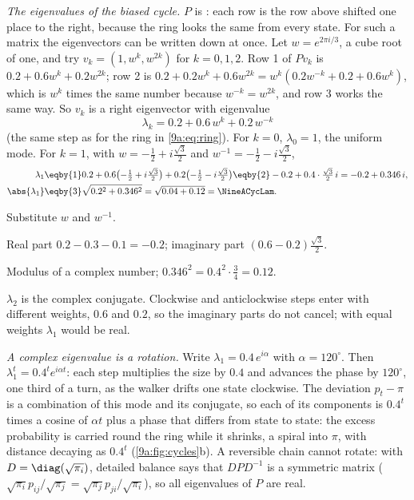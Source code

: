 \emph{The eigenvalues of the biased cycle.} $P$ is : each row is the row
above shifted one place to the right, because the ring looks the same from every state. For such
a matrix the eigenvectors can be written down at once. Let $w=e^{2\pi i/3}$, a cube root of
one, and try $v_k=(1,w^k,w^{2k})$ for $k=0,1,2$. Row 1 of $Pv_k$ is
$0.2+0.6w^k+0.2w^{2k}$; row 2 is $0.2+0.2w^k+0.6w^{2k}=w^k(0.2w^{-k}+0.2+0.6w^k)$, which is
$w^k$ times the same number because $w^{-k}=w^{2k}$, and row 3 works the same way. So $v_k$ is
a right eigenvector with eigenvalue
\begin{equation*}
  \lambda_k=0.2+0.6\,w^k+0.2\,w^{-k}
\end{equation*}
(the same step as for the ring in \eqref{9a:eq:ring}). For $k=0$, $\lambda_0=1$, the uniform
mode. For $k=1$, with $w=-\tfrac12+i\tfrac{\sqrt3}2$ and $w^{-1}=-\tfrac12-i\tfrac{\sqrt3}2$,
\begin{align*}
  \lambda_1&\eqby{1}0.2+0.6\bigl(-\tfrac12+i\tfrac{\sqrt3}2\bigr)+0.2\bigl(-\tfrac12-i\tfrac{\sqrt3}2\bigr)
   \eqby{2}-0.2+0.4\cdot\tfrac{\sqrt3}2\,i=-0.2+0.346\,i,\\
  \abs{\lambda_1}&\eqby{3}\sqrt{0.2^2+0.346^2}=\sqrt{0.04+0.12}=\NineACycLam .
\end{align*}
\begin{explain}
  \item Substitute $w$ and $w^{-1}$.
  \item Real part $0.2-0.3-0.1=-0.2$; imaginary part $(0.6-0.2)\tfrac{\sqrt3}2$.
  \item Modulus of a complex number; $0.346^2=0.4^2\cdot\tfrac34=0.12$.
\end{explain}
$\lambda_2$ is the complex conjugate. Clockwise and anticlockwise steps enter with different
weights, $0.6$ and $0.2$, so the imaginary parts do not cancel; with equal weights $\lambda_1$
would be real.

\emph{A complex eigenvalue is a rotation.} Write $\lambda_1=0.4\,e^{i\alpha}$ with
$\alpha=120^\circ$. Then $\lambda_1^t=0.4^t e^{i\alpha t}$: each step multiplies the size by
$0.4$ and advances the phase by $120^\circ$, one third of a turn, as the walker drifts one state
clockwise. The deviation $p_t-\pi$ is a combination of this mode and its conjugate, so each of its
components is $0.4^t$ times a cosine of $\alpha t$ plus a phase that differs from state to state: the excess probability is carried round the
ring while it shrinks, a spiral into $\pi$, with distance decaying as $0.4^t$
(\cref{9a:fig:cycles}b).
A reversible chain cannot rotate: with $D=\diag(\sqrt{\pi_i})$, detailed balance says that
$DPD^{-1}$ is a symmetric matrix ($\sqrt{\pi_i}p_{ij}/\sqrt{\pi_j}=\sqrt{\pi_j}p_{ji}/\sqrt{\pi_i}$),
so all eigenvalues of $P$ are real.

